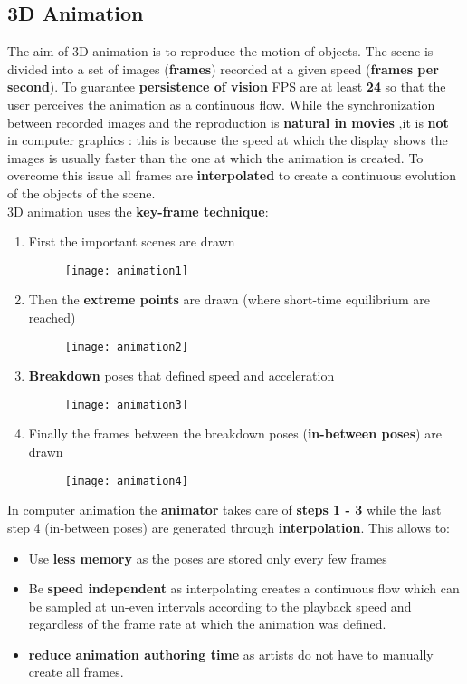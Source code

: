 \subsection{3D Animation}
The aim of 3D animation is to reproduce the motion of objects. The scene is divided into a set of images (\textbf{frames}) recorded at a given speed (\textbf{frames per second}). To guarantee \textbf{persistence of vision} FPS are at least \textbf{24} so that the user perceives the animation as a continuous flow. While the synchronization between recorded images and the reproduction is \textbf{natural in movies} ,it is \textbf{not} in computer graphics : this is because the speed at which the display shows the images is usually faster than the one at which the animation is created. To overcome this issue all frames are \textbf{interpolated} to create a continuous evolution of the objects of the scene. \\ 3D animation uses the \textbf{key-frame technique}:
\begin{enumerate}

\item First the important scenes are drawn 
 \begin{figure}[H]
 \centering
 \texttt{[image: animation1]} 
 \end{figure}
\item Then the \textbf{extreme points} are drawn  (where short-time equilibrium are reached)
 \begin{figure}[H]
 \centering
 \texttt{[image: animation2]} 
 \end{figure}
\item \textbf{Breakdown} poses that defined speed and acceleration
 \begin{figure}[H]
 \centering
 \texttt{[image: animation3]} 
 \end{figure}
\item Finally the frames between the breakdown poses (\textbf{in-between poses}) are drawn
 \begin{figure}[H]
 \centering
 \texttt{[image: animation4]} 
 \end{figure}
\end{enumerate} 
In computer animation the \textbf{animator} takes care of \textbf{steps 1 - 3} while the last step 4 (in-between poses) are generated through \textbf{interpolation}. This allows to: 
\begin{itemize}
\item Use \textbf{less memory }as the poses are stored only every few frames
\item Be \textbf{speed independent} as interpolating creates a continuous flow which can be sampled at un-even intervals according to the playback speed and regardless of the frame rate at which the animation was defined.
\item  \textbf{reduce animation authoring time} as artists do not have to manually create all frames.
\end{itemize}
